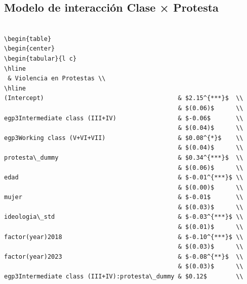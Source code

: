 \documentclass[
  12pt,
]{article}
\begin{document}
\subsection{Modelo de interacción Clase ×
Protesta}\label{modelo-de-interacciuxf3n-clase-protesta}

\begin{verbatim}

\begin{table}
\begin{center}
\begin{tabular}{l c}
\hline
 & Violencia en Protestas \\
\hline
(Intercept)                                     & $2.15^{***}$  \\
                                                & $(0.06)$      \\
egp3Intermediate class (III+IV)                 & $-0.06$       \\
                                                & $(0.04)$      \\
egp3Working class (V+VI+VII)                    & $0.08^{*}$    \\
                                                & $(0.04)$      \\
protesta\_dummy                                 & $0.34^{***}$  \\
                                                & $(0.06)$      \\
edad                                            & $-0.01^{***}$ \\
                                                & $(0.00)$      \\
mujer                                           & $-0.01$       \\
                                                & $(0.03)$      \\
ideologia\_std                                  & $-0.03^{***}$ \\
                                                & $(0.01)$      \\
factor(year)2018                                & $-0.10^{***}$ \\
                                                & $(0.03)$      \\
factor(year)2023                                & $-0.08^{**}$  \\
                                                & $(0.03)$      \\
egp3Intermediate class (III+IV):protesta\_dummy & $0.12$        \\

\end{verbatim}
\end{document}
